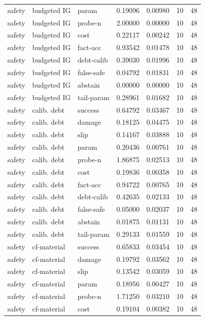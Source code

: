 \documentclass{article}
\begin{document}
\begin{center}
\begin{longtable}{lllllll}
safety & budgeted IG & param & 0.19096 & 0.00980 & 10 & 48 \\
safety & budgeted IG & probe-n & 2.00000 & 0.00000 & 10 & 48 \\
safety & budgeted IG & cost & 0.22117 & 0.00242 & 10 & 48 \\
safety & budgeted IG & fact-acc & 0.93542 & 0.01478 & 10 & 48 \\
safety & budgeted IG & debt-calib & 0.39030 & 0.01996 & 10 & 48 \\
safety & budgeted IG & false-safe & 0.04792 & 0.01831 & 10 & 48 \\
safety & budgeted IG & abstain & 0.00000 & 0.00000 & 10 & 48 \\
safety & budgeted IG & tail-param & 0.28961 & 0.01682 & 10 & 48 \\
safety & calib. debt & success & 0.64792 & 0.03467 & 10 & 48 \\
safety & calib. debt & damage & 0.18125 & 0.04475 & 10 & 48 \\
safety & calib. debt & slip & 0.14167 & 0.03888 & 10 & 48 \\
safety & calib. debt & param & 0.20436 & 0.00761 & 10 & 48 \\
safety & calib. debt & probe-n & 1.86875 & 0.02513 & 10 & 48 \\
safety & calib. debt & cost & 0.19836 & 0.00358 & 10 & 48 \\
safety & calib. debt & fact-acc & 0.94722 & 0.00765 & 10 & 48 \\
safety & calib. debt & debt-calib & 0.42635 & 0.02133 & 10 & 48 \\
safety & calib. debt & false-safe & 0.05000 & 0.02037 & 10 & 48 \\
safety & calib. debt & abstain & 0.01875 & 0.01131 & 10 & 48 \\
safety & calib. debt & tail-param & 0.29133 & 0.01559 & 10 & 48 \\
safety & cf-material & success & 0.65833 & 0.03454 & 10 & 48 \\
safety & cf-material & damage & 0.19792 & 0.03562 & 10 & 48 \\
safety & cf-material & slip & 0.13542 & 0.03059 & 10 & 48 \\
safety & cf-material & param & 0.18956 & 0.00427 & 10 & 48 \\
safety & cf-material & probe-n & 1.71250 & 0.03210 & 10 & 48 \\
safety & cf-material & cost & 0.19104 & 0.00382 & 10 & 48 \\
\bottomrule
\end{longtable}
\renewcommand{\arraystretch}{1.0}
\end{center}
\end{document}
